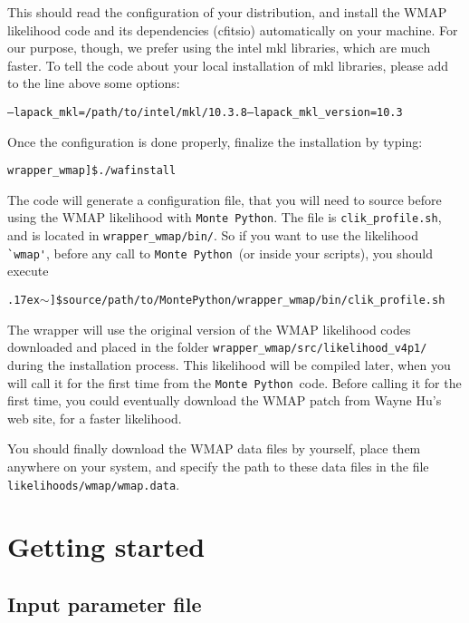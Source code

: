 \documentclass[10pt]{article}
\newcommand{\MP}{\texttt{Monte Python}}
\newcommand{\tild}{\raise.17ex\hbox{$\scriptstyle\mathtt{\sim}$}}
\begin{document}
  This should read the configuration of your distribution, and install the WMAP likelihood code and its
  dependencies (cfitsio) automatically on your machine. For our purpose,
  though, we prefer using the intel mkl libraries, which are much faster. To
  tell the code about your local installation of mkl libraries, please add to the line above some options:
  \begin{alltt}
     --lapack_mkl=/path/to/intel/mkl/10.3.8 --lapack_mkl_version=10.3
  \end{alltt}

  Once the configuration is done properly, finalize the installation by typing:
  
  \begin{alltt}
    wrapper_wmap]\$ ./waf install
  \end{alltt}

  The code will generate a configuration file, that you will need to source
  before using the WMAP likelihood with \MP. The file is \verb?clik_profile.sh?, and is located
  in \verb?wrapper_wmap/bin/?. So if you want to use the likelihood \verb?`wmap'?, before any call to \MP~(or inside your
  scripts), you should execute

  \begin{alltt}
    \tild]\$ source /path/to/MontePython/wrapper_wmap/bin/clik_profile.sh
  \end{alltt}

The wrapper will use the original version of the WMAP likelihood codes downloaded and placed in the folder \verb?wrapper_wmap/src/likelihood_v4p1/? during the installation process. This likelihood will be compiled later, when you will call it for the first time from the \MP~code. Before calling it for the first time, you could eventually download the WMAP patch from Wayne Hu's web site, for a faster likelihood.

You should finally download the WMAP data files by yourself, place them anywhere on your system, and specify the path to these data files in the file \verb?likelihoods/wmap/wmap.data?.

\section{Getting started}

\subsection{Input parameter file}
\end{document}
